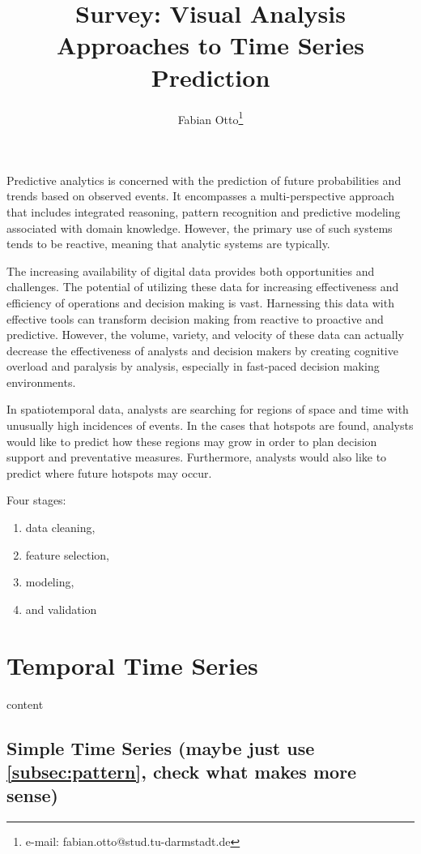 \documentclass[electronic]{vgtc}             %
\title{Survey: Visual Analysis Approaches to Time Series Prediction}
\author{Fabian Otto\thanks{e-mail: fabian.otto@stud.tu-darmstadt.de}}
\affiliation{\scriptsize Technical University Darmstadt}
\begin{document}

\maketitle

Predictive analytics is concerned with the prediction of future probabilities and trends based on observed events. 
It encompasses a multi-perspective approach that includes integrated reasoning, pattern recognition and predictive modeling associated with domain knowledge.
However, the primary use of such systems tends to be reactive, meaning that analytic systems are typically.

The increasing availability of digital data provides both opportunities and challenges.
The potential of utilizing these data for increasing effectiveness and efficiency of operations and decision making is vast. 
Harnessing this data with effective tools can transform decision making from reactive to proactive and predictive. 
However, the volume, variety, and velocity of these data can actually decrease the effectiveness of analysts and decision makers by creating cognitive overload and paralysis by analysis, especially in fast-paced decision making environments.

In spatiotemporal data, analysts are searching for regions of space and time with unusually high incidences of events.
In the cases that hotspots are found, analysts would like to predict how these regions may grow in order to plan decision support and preventative measures.
Furthermore, analysts would also like to predict where future hotspots may occur.

Four stages:
\begin{enumerate}
	\item data cleaning, 
	\item feature selection, 
	\item modeling, 
	\item and validation
	
\end{enumerate}

\section{Temporal Time Series \label{sec:temporal}}
content 
\subsection{Simple Time Series (maybe just use \autoref{subsec:pattern}, check what makes more sense)\label{subsec:simple}}
\end{document}
